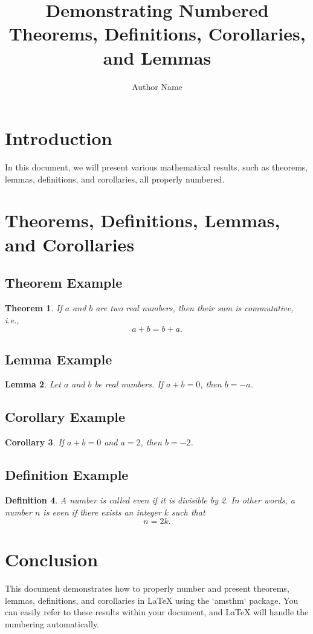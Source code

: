 \documentclass[a4paper,12pt]{article}
\newtheorem{theorem}{Theorem}[section] %
\newtheorem{lemma}[theorem]{Lemma} %
\newtheorem{corollary}[theorem]{Corollary} %
\newtheorem{definition}[theorem]{Definition} %
\begin{document}
 
\title{Demonstrating Numbered Theorems, Definitions, Corollaries, and Lemmas} 
\author{Author Name} %
\section*{Introduction} In this document, we will present various mathematical results, such as 
theorems, lemmas, definitions, and corollaries, all properly numbered. 
\section{Theorems, Definitions, Lemmas, and Corollaries}  
\subsection*{Theorem Example} \begin{theorem} 
If \( a \) and \( b \) are two real numbers, then their sum is commutative, i.e.,  
\[ a + b = b + a. \] 
\end{theorem}  
\subsection*{Lemma Example}  
\begin{lemma}  
Let \( a \) and \( b \) be real numbers. If \( a + b = 0 \), then \( b = -a \).  
\end{lemma} 
\subsection*{Corollary Example}  
\begin{corollary} 
If \( a + b = 0 \) and \( a = 2 \), then \( b = -2 \).  
\end{corollary} 
\subsection*{Definition Example} 
\begin{definition}  
A number is called \textit{even} if it is divisible by 2. In other words, a number \( n \) is even if 
there exists an integer \( k \) such that  
\[ 
n = 2k. 
\]  
\end{definition}  
\section{Conclusion}  
This document demonstrates how to properly number and present theorems, lemmas, 
definitions, and corollaries in LaTeX using the `amsthm` package. You can easily refer to these 
results within your document, and LaTeX will handle the numbering automatically. 
\end{document}
